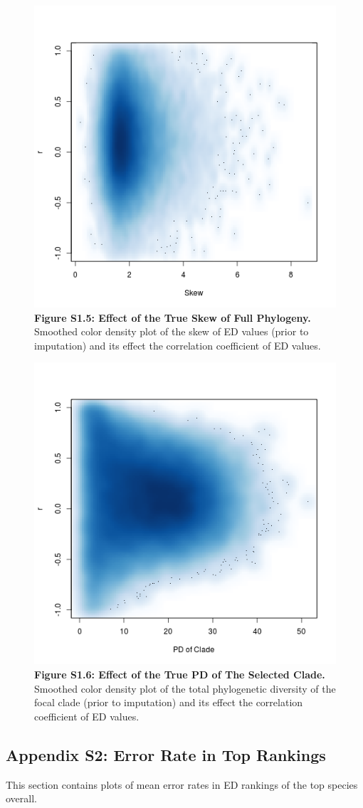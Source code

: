 \documentclass[10pt,english]{article}
\begin{document}
\begin{figure}[!ht]
  \center
  \includegraphics[width=.5\textwidth]{../figures/originalSkew.png}
  \caption*{\textbf{Figure S1.5: Effect of the True Skew of Full Phylogeny.}
  Smoothed color density plot of the skew of ED values (prior to
  imputation) and its effect the correlation coefficient of ED values.}
\end{figure}

\begin{figure}[!ht]
  \center
  \includegraphics[width=.5\textwidth]{../figures/cladePD.png}
  \caption*{\textbf{Figure S1.6: Effect of the True PD of The Selected Clade.}
  Smoothed color density plot of the total phylogenetic diversity of the focal
  clade (prior to imputation) and its effect the correlation coefficient of ED
  values.}
\end{figure}

\clearpage
\subsection*{Appendix S2: Error Rate in Top Rankings}

This section contains plots of mean error rates in ED rankings of the top
species overall. 
\end{document}
